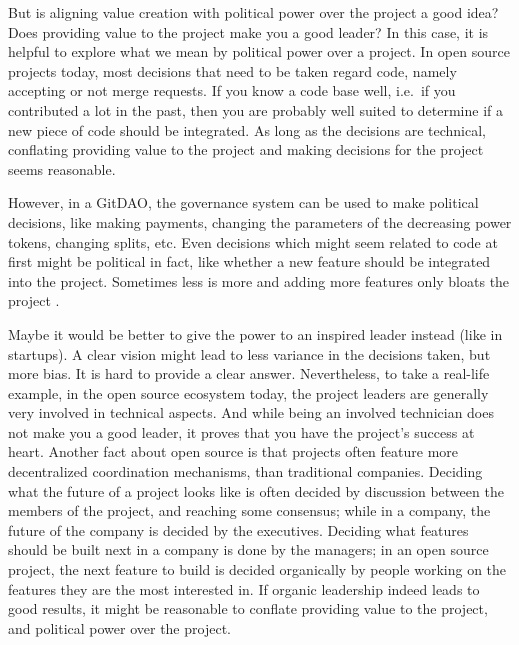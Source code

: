 But is aligning value creation with political power over the project a good idea?
Does providing value to the project make you a good leader?
In this case, it is helpful to explore what we mean by political power over a project.
In open source projects today, most decisions that need to be taken regard code, namely accepting or not merge requests.
If you know a code base well, i.e.\ if you contributed a lot in the past, then you are probably well suited to determine if a new piece of code should be integrated.
As long as the decisions are technical, conflating providing value to the project and making decisions for the project seems reasonable.

However, in a GitDAO, the governance system can be used to make political decisions, like making payments, changing the parameters of the decreasing power tokens, changing splits, etc.
Even decisions which might seem related to code at first might be political in fact, like whether a new feature should be integrated into the project.
Sometimes less is more and adding more features only bloats the project%
.

Maybe it would be better to give the power to an inspired leader instead (like in startups).
A clear vision might lead to less variance in the decisions taken, but more bias.
It is hard to provide a clear answer.
Nevertheless, to take a real-life example, in the open source ecosystem today, the project leaders are generally very involved in technical aspects.
And while being an involved technician does not make you a good leader, it proves that you have the project's success at heart.
Another fact about open source is that projects often feature more decentralized coordination mechanisms, than traditional companies.
Deciding what the future of a project looks like is often decided by discussion between the members of the project, and reaching some consensus; while in a company, the future of the company is decided by the executives.
Deciding what features should be built next in a company is done by the managers; in an open source project, the next feature to build is decided organically by people working on the features they are the most interested in.
If organic leadership indeed leads to good results, it might be reasonable to conflate providing value to the project, and political power over the project.

